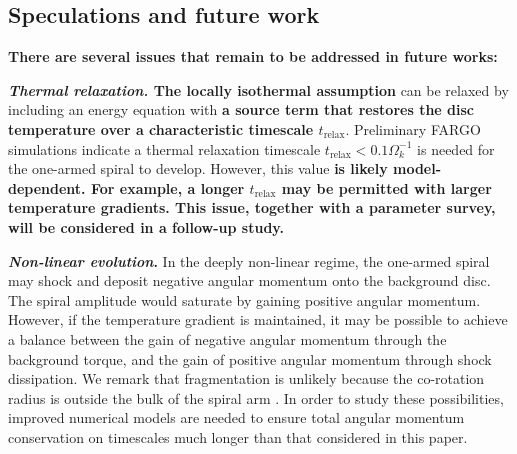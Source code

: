 \subsection{Speculations and future work}

{\bf There are several issues that remain to be addressed in future
  works:} 

{\bf \emph{Thermal relaxation.} The locally isothermal assumption 
} can be relaxed by including an energy equation with
{\bf a source term that restores the disc temperature over a
  characteristic timescale $t_\mathrm{relax}$}. Preliminary FARGO
simulations indicate a thermal relaxation timescale $t_\mathrm{relax} <
0.1\Omega_k^{-1}$ is needed for the one-armed spiral to
develop. However, this value {\bf is likely model-dependent. For example,
a longer $t_\mathrm{relax}$ may be permitted with larger temperature
gradients. This issue, together with a parameter survey, will be
considered in a follow-up study.} 


{\bf \emph{Non-linear evolution}.} In the deeply non-linear regime, the
one-armed spiral may  
shock and deposit negative angular momentum onto 
the background disc. The spiral amplitude would saturate by gaining
positive angular momentum. However, if the temperature gradient is
maintained, it may be possible to achieve a balance between the gain
of negative angular momentum through the background torque, and the
gain of positive angular momentum through shock dissipation. We remark  
that fragmentation is unlikely because the co-rotation radius is
outside the bulk of the spiral arm \citep{durisen08}. In order
to study these possibilities, improved numerical models are needed to
ensure total angular momentum conservation on timescales much longer
than that considered in this paper. 



